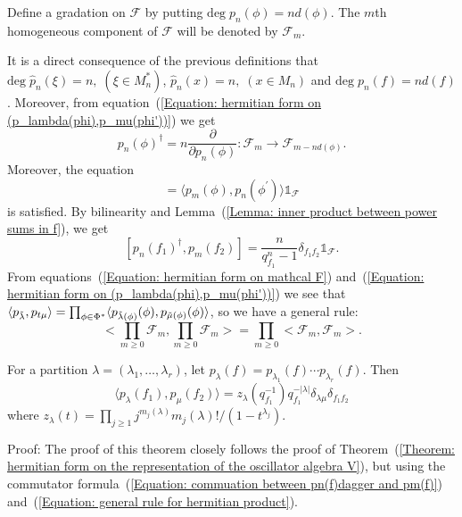 \begin{dang}
    \begin{definition}
        Define a gradation on $\mathcal{F}$ by putting $\text{deg}\;p_n(\phi)=nd(\phi)$. The $m$th homogeneous component of $\mathcal{F}$ will be denoted by $\mathcal{F}_m$.
    \end{definition}
\end{dang}
It is a direct consequence of the previous definitions that $\text{deg}\;\hat{p}_n(\xi)=n,\;(\xi\in M_n^*)$, $\hat{p}_n(x)=n,\;(x\in M_n)$ and $\text{deg}\;p_n(f)= nd(f)$. Moreover, from equation~(\ref{Equation: hermitian form on (p_lambda(phi),p_mu(phi'))}) we get
\begin{equation}
    p_n(\phi)^\dagger = n\frac{\partial}{\partial p_n(\phi)}:\mathcal{F}_m\rightarrow \mathcal{F}_{m-nd(\phi)}.
\end{equation}
Moreover, the equation 
\begin{equation}
    [p_m(\phi)^\dagger,p_n(\phi^\prime)]=\langle p_m(\phi),p_n(\phi^\prime) \rangle\mathds{1}_{\mathcal{F}}
\end{equation}
is satisfied. By bilinearity and Lemma~(\ref{Lemma: inner product between power sums in f}), we get
\begin{equation}\label{Equation: commuation between pn(f)dagger and pm(f)}
    [p_n(f_1)^\dagger,p_m(f_2)]=\frac{n}{q_{f_1}^n-1}\delta_{f_1f_2}\mathds{1}_{\mathcal{F}}.
\end{equation}
From equations~(\ref{Equation: hermitian form on mathcal F}) and~(\ref{Equation: hermitian form on (p_lambda(phi),p_mu(phi'))}) we see that $\langle p_{\Tilde{\lambda}}, p_{t\mu}\rangle = \prod_{\phi\in\Phi^*}\langle p_{\Tilde{\lambda}(\phi)}(\phi),p_{\Tilde{\mu}(\phi)}(\phi)\rangle$, so we have a general rule:
\begin{equation}\label{Equation: general rule for hermitian product}
    \biggl< \prod_{m\geq0}\mathcal{F}_m, \prod_{m\geq0}\mathcal{F}_m\biggr> =\prod_{m\geq0}\big<\mathcal{F}_m,\mathcal{F}_m\bigr>.
\end{equation}


\begin{dang}
    \begin{theorem}\cite{jing2024characters}\label{Theorem: orthogonality of pm(f)}
        For a partition $\lambda=(\lambda_1,\dots,\lambda_r)$, let $p_\lambda(f) = p_{\lambda_1}(f)\cdots p_{\lambda_r}(f)$. Then
         \begin{equation}
             \langle p_\lambda(f_1),p_\mu(f_2)\rangle = z_\lambda(q_{f_1}^{-1})q_{f_1}^{-|\lambda|}\delta_{\lambda\mu}\delta_{f_1f_2}
         \end{equation}
         where $z_\lambda(t) = \prod_{j\geq1}j^{m_j(\lambda)}m_j(\lambda)!/(1-t^{\lambda_j})$.
    \end{theorem}
\end{dang}
Proof: The proof of this theorem closely follows the proof of Theorem~(\ref{Theorem: hermitian form on the representation of the oscillator algebra V}), but using the commutator formula~(\ref{Equation: commuation between pn(f)dagger and pm(f)}) and~(\ref{Equation: general rule for hermitian product}).

